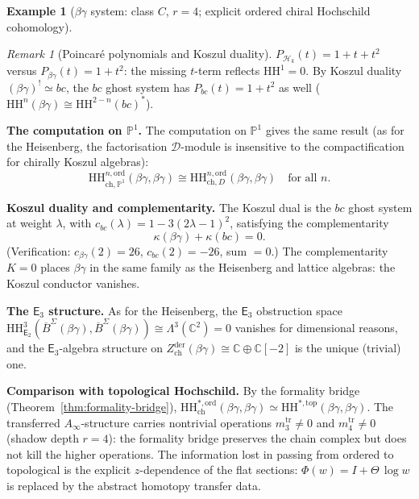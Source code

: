 \documentclass[11pt,reqno]{amsart}
\theoremstyle{definition}
\newtheorem{example}[theorem]{Example}
\theoremstyle{remark}
\newtheorem{remark}[theorem]{Remark}
\newcommand{\cD}{\mathcal{D}}
\newcommand{\cH}{\mathcal{H}}
\newcommand{\HH}{\mathrm{HH}}
\newcommand{\Ainf}{A_{\infty}}
\newcommand{\Etwo}{\mathsf{E}_{2}}
\newcommand{\Ethree}{\mathsf{E}_{3}}
\newcommand{\BarSig}{\overline{B}^{\Sigma}}
\newcommand{\CC}{\mathbb{C}}
\newcommand{\PP}{\mathbb{P}}
\numberwithin{equation}{section}
\begin{document}
\begin{example}[$\beta\gamma$ system: class $C$, $r = 4$;
explicit ordered chiral Hochschild cohomology]
\begin{remark}[Poincar\'e polynomials and Koszul duality]
\label{rem:bg-poincare-comparison}
$P_{\cH_k}(t) = 1 + t + t^2$ versus
$P_{\beta\gamma}(t) = 1 + t^2$: the missing $t$-term
reflects $\HH^1 = 0$. By Koszul duality
$(\beta\gamma)^! \simeq bc$, the $bc$ ghost system has
$P_{bc}(t) = 1 + t^2$ as well
($\HH^n(\beta\gamma) \cong \HH^{2-n}(bc)^*$).
\end{remark}

\medskip
\noindent
\textbf{The computation on $\PP^1$.}
The computation on $\PP^1$ gives the same result
(as for the Heisenberg, the factorisation $\cD$-module is
insensitive to the compactification for chirally Koszul
algebras):
\begin{equation}\label{eq:bg-hh-P1}
\HH^{n,\mathrm{ord}}_{\mathrm{ch,\PP^1}}(\beta\gamma,
\beta\gamma)
\cong
\HH^{n,\mathrm{ord}}_{\mathrm{ch},D}(\beta\gamma,
\beta\gamma)
\quad \text{for all } n.
\end{equation}

\medskip
\noindent
\textbf{Koszul duality and complementarity.}
The Koszul dual is the $bc$ ghost system at weight $\lambda$,
with $c_{bc}(\lambda) = 1 - 3(2\lambda - 1)^2$, satisfying
the complementarity
\begin{equation}\label{eq:bg-bc-compl}
  \kappa(\beta\gamma) + \kappa(bc) = 0.
\end{equation}
(Verification: $c_{\beta\gamma}(2) = 26$,
$c_{bc}(2) = -26$, sum $= 0$.)
The complementarity $K = 0$ places $\beta\gamma$ in the same
family as the Heisenberg and lattice algebras: the Koszul
conductor vanishes.

\medskip
\noindent
\textbf{The $\Ethree$ structure.}
As for the Heisenberg, the $\Ethree$ obstruction space
$\HH^3_{\Etwo}(\BarSig(\beta\gamma), \BarSig(\beta\gamma))
\cong \Lambda^3(\CC^2) = 0$
vanishes for dimensional reasons, and the $\Ethree$-algebra
structure on
$Z^{\mathrm{der}}_{\mathrm{ch}}(\beta\gamma)
\cong \CC \oplus \CC[-2]$
is the unique (trivial) one.

\medskip
\noindent
\textbf{Comparison with topological Hochschild.}
By the formality bridge (Theorem~\ref{thm:formality-bridge}),
$\HH^{*,\mathrm{ord}}_{\mathrm{ch}}(\beta\gamma, \beta\gamma)
\simeq \HH^{*,\mathrm{top}}(\beta\gamma, \beta\gamma)$.
The transferred $\Ainf$-structure carries
nontrivial operations $m_3^{\mathrm{tr}} \neq 0$ and
$m_4^{\mathrm{tr}} \neq 0$ (shadow depth $r = 4$): the
formality bridge preserves the chain complex but does
not kill the higher operations.
The information lost in passing from ordered to topological
is the explicit $z$-dependence of the flat sections:
$\Phi(w) = I + \Theta\,\log w$ is replaced by the abstract
homotopy transfer data.
\end{example}
\end{document}
